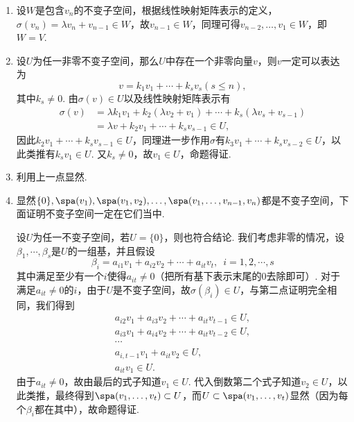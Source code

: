 \begin{solution}
    \begin{enumerate}
        \item 设$W$是包含$v_n$的不变子空间，根据线性映射矩阵表示的定义，$\sigma(v_n)=\lambda v_n+v_{n-1}\in W$，故$v_{n-1}\in W$，同理可得$v_{n-2},\ldots,v_1\in W$，即$W=V$.

        \item 设$U$为任一非零不变子空间，那么$U$中存在一个非零向量$v$，则$v$一定可以表达为
              \[v=k_1v_1+\cdots+k_sv_s(s\leqslant n),\]
              其中$k_s\neq 0$. 由$\sigma(v)\in U$以及线性映射矩阵表示有
              \begin{align*}
                  \sigma(v) & = \lambda k_1v_1+k_2(\lambda v_2+v_1)+\cdots+k_s(\lambda v_s+v_{s-1}) \\
                            & = \lambda v+k_2v_1+\cdots+k_sv_{s-1}\in U,
              \end{align*}
              因此$k_2v_1+\cdots+k_sv_{s-1}\in U$，同理进一步作用$\sigma$有$k_3v_1+\cdots+k_sv_{s-2}\in U$，以此类推有$k_sv_1\in U$. 又$k_s\neq 0$，故$v_1\in U$，命题得证.

        \item 利用上一点显然.

        \item 显然$\{0\},\spa(v_1),\spa(v_1,v_2),\ldots,\spa(v_1,\ldots,v_{n-1},v_n)$都是不变子空间，下面证明不变子空间一定在它们当中.

              设$U$为任一不变子空间，若$U=\{0\}$，则也符合结论. 我们考虑非零的情况，设$\beta_1,\cdots,\beta_s$是$U$的一组基，并且假设
              \[\beta_i=a_{i1}v_1+a_{i2}v_2+\cdots+a_{it}v_t,\enspace i=1,2,\cdots,s\]
              其中满足至少有一个$i$使得$a_{it}\neq 0$（把所有基下表示末尾的0去除即可）. 对于满足$a_{it}\neq 0$的$i$，由于$U$是不变子空间，故$\sigma(\beta_i)\in U$，与第二点证明完全相同，我们得到
              \begin{align*}
                  a_{i2}v_1+a_{i3}v_2+\cdots+a_{it}v_{t-1}\in U, \\
                  a_{i3}v_1+a_{i4}v_2+\cdots+a_{it}v_{t-2}\in U, \\
                  \cdots                                         \\
                  a_{i,t-1}v_1+a_{it}v_2\in U,                   \\
                  a_{it}v_1\in U.
              \end{align*}
              由于$a_{it}\neq 0$，故由最后的式子知道$v_1\in U$. 代入倒数第二个式子知道$v_2\in U$，以此类推，最终得到$\spa(v_1,\ldots,v_t)\subset U$，而$U\subset\spa(v_1,\ldots,v_t)$显然（因为每个$\beta_i$都在其中），故命题得证.
    \end{enumerate}
\end{solution}

